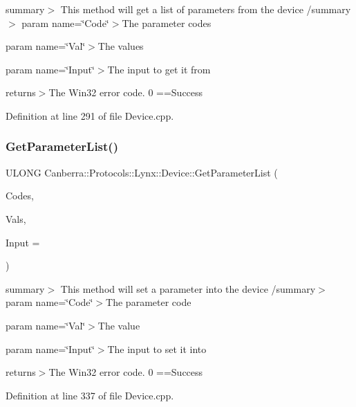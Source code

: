 summary$>$ This method will get a list of parameters from the device /summary$>$ param name=\char`\"{}\+Code\char`\"{}$>$The parameter codes

param name=\char`\"{}\+Val\char`\"{}$>$The values

param name=\char`\"{}\+Input\char`\"{}$>$The input to get it from

returns$>$The Win32 error code. 0 ==Success

Definition at line 291 of file Device.\+cpp.

\mbox{\label{class_canberra_1_1_protocols_1_1_lynx_1_1_device_a33bd6bcde5356867647a30b1bd7ed343_a33bd6bcde5356867647a30b1bd7ed343}} 
\subsubsection{\texorpdfstring{Get\+Parameter\+List()}{GetParameterList()}}
{\footnotesize\ttfamily U\+L\+O\+NG Canberra\+::\+Protocols\+::\+Lynx\+::\+Device\+::\+Get\+Parameter\+List (\begin{DoxyParamCaption}\item[{std\+::vector$<$ L\+O\+NG $>$ \&}]{Codes,  }\item[{std\+::vector$<$ \hyperlink{class_canberra_1_1_utility_1_1_core_1_1_variant}{Canberra\+::\+Utility\+::\+Core\+::\+Variant} $>$ \&}]{Vals,  }\item[{U\+S\+H\+O\+RT}]{Input = {} }\end{DoxyParamCaption})}

summary$>$ This method will set a parameter into the device /summary$>$ param name=\char`\"{}\+Code\char`\"{}$>$The parameter code

param name=\char`\"{}\+Val\char`\"{}$>$The value

param name=\char`\"{}\+Input\char`\"{}$>$The input to set it into

returns$>$The Win32 error code. 0 ==Success

Definition at line 337 of file Device.\+cpp.

\mbox{\label{class_canberra_1_1_protocols_1_1_lynx_1_1_device_ad3cbed9925aa49688846a18e8eedfbd1_ad3cbed9925aa49688846a18e8eedfbd1}} 
